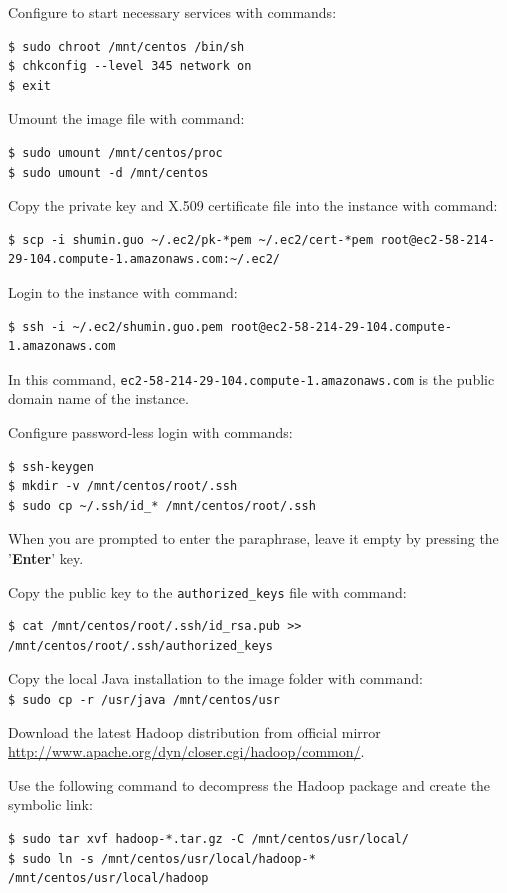 Configure to start necessary services with commands:
\lstset{style=bashstyle}
\begin{lstlisting}
$ sudo chroot /mnt/centos /bin/sh
$ chkconfig --level 345 network on
$ exit
\end{lstlisting}

Umount the image file with command:
\lstset{style=bashstyle}
\begin{lstlisting}
$ sudo umount /mnt/centos/proc
$ sudo umount -d /mnt/centos
\end{lstlisting}

Copy the private key and X.509 certificate file into the instance with command:
\lstset{style=bashstyle}
\begin{lstlisting}
$ scp -i shumin.guo ~/.ec2/pk-*pem ~/.ec2/cert-*pem root@ec2-58-214-29-104.compute-1.amazonaws.com:~/.ec2/
\end{lstlisting}

Login to the instance with command:
\lstset{style=bashstyle}
\begin{lstlisting}
$ ssh -i ~/.ec2/shumin.guo.pem root@ec2-58-214-29-104.compute-1.amazonaws.com
\end{lstlisting}

In this command, \verb|ec2-58-214-29-104.compute-1.amazonaws.com| is the public domain name of the instance.

Configure password-less login with commands:
\lstset{style=bashstyle}
\begin{lstlisting}
$ ssh-keygen
$ mkdir -v /mnt/centos/root/.ssh
$ sudo cp ~/.ssh/id_* /mnt/centos/root/.ssh
\end{lstlisting}

When you are prompted to enter the paraphrase, leave it empty by pressing the '\textbf{Enter}' key.

Copy the public key to the \verb|authorized_keys| file with command:
\lstset{style=bashstyle}
\begin{lstlisting}
$ cat /mnt/centos/root/.ssh/id_rsa.pub >> /mnt/centos/root/.ssh/authorized_keys
\end{lstlisting}

Copy the local Java installation to the image folder with command: \\
\verb|$ sudo cp -r /usr/java /mnt/centos/usr|

Download the latest Hadoop distribution from official mirror \url{http://www.apache.org/dyn/closer.cgi/hadoop/common/}.

Use the following command to decompress the Hadoop package and create the symbolic link:
\lstset{style=bashstyle}
\begin{lstlisting}
$ sudo tar xvf hadoop-*.tar.gz -C /mnt/centos/usr/local/
$ sudo ln -s /mnt/centos/usr/local/hadoop-* /mnt/centos/usr/local/hadoop
\end{lstlisting}

